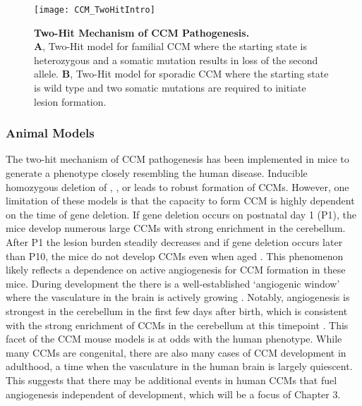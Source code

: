 \begin{figure}[tbp!]
\begin{center}
\texttt{[image: CCM\_TwoHitIntro]}
\end{center}
\caption[Two-Hit Mechanism of CCM Pathogenesis.] {\textbf{Two-Hit Mechanism of CCM Pathogenesis.} \\ \textbf{A}, Two-Hit model for familial CCM where the starting state is heterozygous and a somatic mutation results in loss of the second allele. \textbf{B}, Two-Hit model for sporadic CCM where the starting state is wild type and two somatic mutations  are required to initiate lesion formation.}

\label{CCM_TwoHitIntro}
\end{figure}

\subsubsection{Animal Models}
The two-hit mechanism of CCM pathogenesis has been implemented in mice to generate a phenotype closely resembling the human disease. Inducible homozygous deletion of , , or  leads to robust formation of CCMs. However, one limitation of these models is that the capacity to form CCM is highly dependent on the time of gene deletion. If gene deletion occurs on postnatal day 1 (P1), the mice develop numerous large CCMs with strong enrichment in the cerebellum. After P1 the lesion burden steadily decreases and if gene deletion occurs later than P10, the mice do not develop CCMs even when aged \citep{boulday2011, detter2020}. This phenomenon likely reflects a dependence on active angiogenesis for CCM formation in these mice. During development the there is a well-established `angiogenic window' where the vasculature in the brain is actively growing \citep{boulday2009}. Notably, angiogenesis is strongest in the cerebellum in the first few days after birth, which is consistent with the strong enrichment of CCMs in the cerebellum at this timepoint \citep{boulday2009}. This facet of the CCM mouse models is at odds with the human phenotype. While many CCMs are congenital, there are also many cases of CCM development in adulthood, a time when the vasculature in the human brain is largely quiescent. This suggests that there may be additional events in human CCMs that fuel angiogenesis independent of development, which will be a focus of Chapter 3.